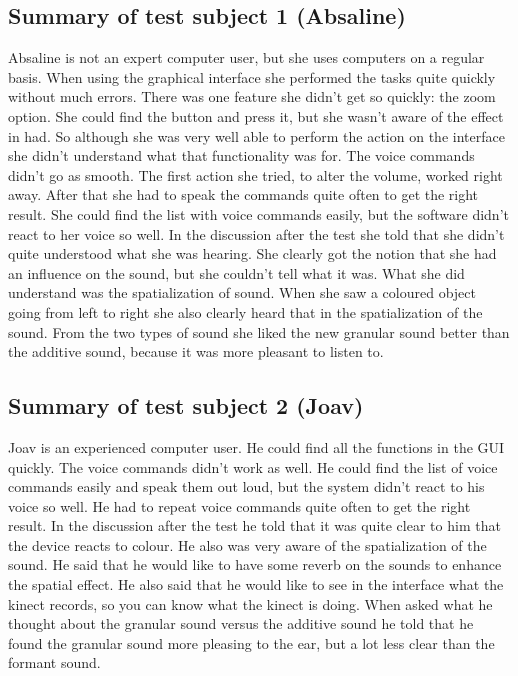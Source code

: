 \documentclass[11pt]{article}
\begin{document}
\subsection{Summary of test subject 1 (Absaline)}
Absaline is not an expert computer user, but she uses computers on a regular basis. When using the graphical interface she performed the tasks quite quickly without much errors. There was one feature she didn't get so quickly: the zoom option. She could find the button and press it, but she wasn't aware of the effect in had. So although she was very well able to perform the action on the interface she didn't understand what that functionality was for. The voice commands didn't go as smooth. The first action she tried, to alter the volume, worked right away. After that she had to speak the commands quite often to get the right result. She could find the list with voice commands easily, but the software didn't react to her voice so well.
\newline
In the discussion after the test she told that she didn't quite understood what she was hearing. She clearly got the notion that she had an influence on the sound, but she couldn't tell what it was. What she did understand was the spatialization of sound. When she saw a coloured object going from left to right she also clearly heard that in the spatialization of the sound. From the two types of sound she liked the new granular sound better than the additive sound, because it was more pleasant to listen to.
\subsection{Summary of test subject 2 (Joav)}
Joav is an experienced computer user. He could find all the functions in the GUI quickly. The voice commands didn't work as well. He could find the list of voice commands easily and speak them out loud, but the system didn't react to his voice so well. He had to repeat voice commands quite often to get the right result. 
\newline
In the discussion after the test he told that it was quite clear to him that the device reacts to colour.  He also was very aware of the spatialization of the sound. He said that he would like to have some reverb on the sounds to enhance the spatial effect. He also said that he would like to see in the interface what the kinect records, so you can know what the kinect is doing. When asked what he thought about the granular sound versus the additive sound he told that he found the granular sound more pleasing to the ear, but a lot less clear than the formant sound.
\end{document}
